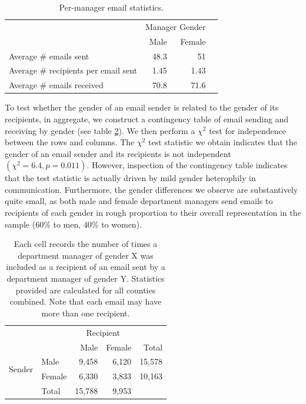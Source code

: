 \documentclass{pnastwo}
\begin{document}
\begin{article}
\begin{table}
  \centering
  \begin{tabular}{m{2.1in}rrr}
    \toprule
    & \multicolumn{2}{c}{Manager Gender} \\
    \cmidrule{2-3}
    & Male & Female  \\
    \midrule
    Average \# emails sent & 48.3 & 51 \\
    Average \# recipients per email sent & 1.45 & 1.43 \\
    \midrule
    Average \# emails received & 70.8 & 71.6 \\
    \bottomrule
  \end{tabular}
  \caption{\label{tab:email agg stats} Per-manager email
    statistics.}
\end{table}

To test whether the gender of an email sender is related to the gender of its recipients, in aggregate, we construct a contingency table of email sending and receiving by gender (see table \ref{tab:gender email agg stats}). We then perform a $\chi^2$ test for independence between the rows and columns. The $\chi^2$ test statistic we obtain indicates that the gender of an email sender and its recipients is not independent $(\chi^2 = 6.4, p = 0.011)$. However, inspection of the contingency table indicates that the test statistic is actually driven by mild gender heterophily in communication. Furthermore, the gender differences we observe are substantively quite small, as both male and female department managers send emails to recipients of each gender in rough proportion to their overall representation in the sample (60\% to men, 40\% to women).  
	
	\begin{table}
	\centering
	\begin{tabular}{rlrrr}
	  \toprule
		 && \multicolumn{2}{c}{Recipient} \\
		\cmidrule{3-4}
	& & Male & Female & Total  \\
		 \midrule
		\multirow{2}{*}{Sender} & Male & 9,458 & 6,120 & 15,578 \\
	& Female & 6,330 & 3,833 & 10,163 \\
	\midrule
		 & Total & 15,788 & 9,953 & \\
		\bottomrule
		\end{tabular}
		\caption{\label{tab:gender email agg stats}Each cell records the number of times a department manager of gender X was included as a recipient of an email sent by a department manager of gender Y. Statistics provided are calculated for all counties combined. Note that each email may have more than one recipient.}
	\end{table}
	

\end{article}
\end{document}
